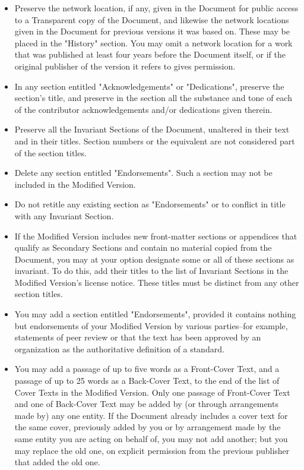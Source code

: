 \begin{itemize}
		\item Preserve the network location, if any, given in the Document for public access to a Transparent copy of the Document, and likewise the network locations given in the Document for previous versions it was based on. These may be placed in the "History" section. You may omit a network location for a work that was published at least four years before the Document itself, or if the original publisher of the version it refers to gives permission. 

		\item In any section entitled "Acknowledgements" or "Dedications", preserve the section's title, and preserve in the section all the substance and tone of each of the contributor acknowledgements and/or dedications given therein. 

		\item Preserve all the Invariant Sections of the Document, unaltered in their text and in their titles. Section numbers or the equivalent are not considered part of the section titles. 

		\item Delete any section entitled "Endorsements". Such a section may not be included in the Modified Version. 

		\item Do not retitle any existing section as "Endorsements" or to conflict in title with any Invariant Section.

		\item If the Modified Version includes new front-matter sections or appendices that qualify as Secondary Sections and contain no material copied from the Document, you may at your option designate some or all of these sections as invariant. To do this, add their titles to the list of Invariant Sections in the Modified Version's license notice. These titles must be distinct from any other section titles. 

		\item You may add a section entitled "Endorsements", provided it contains nothing but endorsements of your Modified Version by various parties--for example, statements of peer review or that the text has been approved by an organization as the authoritative definition of a standard. 

		\item You may add a passage of up to five words as a Front-Cover Text, and a passage of up to 25 words as a Back-Cover Text, to the end of the list of Cover Texts in the Modified Version. Only one passage of Front-Cover Text and one of Back-Cover Text may be added by (or through arrangements made by) any one entity. If the Document already includes a cover text for the same cover, previously added by you or by arrangement made by the same entity you are acting on behalf of, you may not add another; but you may replace the old one, on explicit permission from the previous publisher that added the old one. 


\end{itemize}
